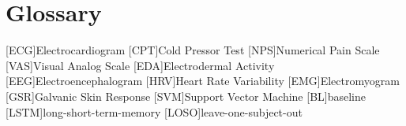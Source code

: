 \chapter{Glossary}

\footnotesize
\SingleSpacing

\begin{acronym}[AAAAAA]

	[ECG]{Electrocardiogram}
	[CPT]{Cold Pressor Test}
	[NPS]{Numerical Pain Scale}
	[VAS]{Visual Analog Scale}
	[EDA]{Electrodermal Activity}
	[EEG]{Electroencephalogram}
	[HRV]{Heart Rate Variability}
	[EMG]{Electromyogram}
	[GSR]{Galvanic Skin Response}
	[SVM]{Support Vector Machine}
	[BL]{baseline}
	[LSTM]{long-short-term-memory}
	[LOSO]{leave-one-subject-out}

\end{acronym}

